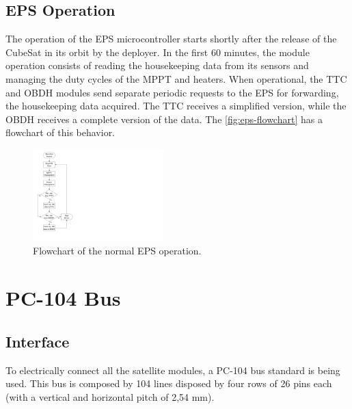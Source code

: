 \subsection{EPS Operation}

The operation of the EPS microcontroller starts shortly after the release of the CubeSat in its orbit by the deployer.
In the first 60 minutes, the module operation consists of reading the housekeeping data from its sensors and managing the duty cycles of the MPPT and heaters.
When operational, the TTC and OBDH modules send separate periodic requests to the EPS for forwarding, the housekeeping data acquired.
The TTC receives a simplified version, while the OBDH receives a complete version of the data.
The \autoref{fig:eps-flowchart} has a flowchart of this behavior.

\begin{figure}[!htb]
    \begin{center}
        \includegraphics[width=0.45\textwidth]{figures/eps_flowchart.pdf}
        \caption{Flowchart of the normal EPS operation.}
        \label{fig:eps-flowchart}
    \end{center}
\end{figure}



\section{PC-104 Bus}

\subsection{Interface}

To electrically connect all the satellite modules, a PC-104 bus standard is being used. This bus is composed by 104 lines disposed by four rows of 26 pins each (with a vertical and horizontal pitch of 2,54 mm).

